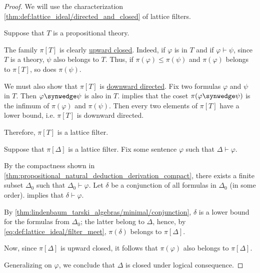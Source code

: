\begin{proof}
   We will use the characterization \cref{thm:def:lattice_ideal/directed_and_closed} of lattice filters.

  \SufficiencySubProof* Suppose that \( T \) is a propositional theory.

  The family \( \pi[T] \) is clearly \hyperref[def:closed_ordered_subset]{upward closed}. Indeed, if \( \varphi \) is in \( T \) and if \( \varphi \vdash \psi \), since \( T \) is a theory, \( \psi \) also belongs to \( T \). Thus, if \( \pi(\varphi) \leq \pi(\psi) \) and \( \pi(\varphi) \) belongs to \( \pi[T] \), so does \( \pi(\psi) \).

  We must also show that \( \pi[T] \) is \hyperref[def:directed_set]{downward directed}. Fix two formulas \( \varphi \) and \( \psi \) in \( T \). Then \( \varphi \synwedge \psi \) is also in \( T \).  implies that the coset \( \pi(\varphi \synwedge \psi) \) is the infimum of \( \pi(\varphi) \) and \( \pi(\psi) \). Then every two elements of \( \pi[T] \) have a lower bound, i.e. \( \pi[T] \) is downward directed.

  Therefore, \( \pi[T] \) is a lattice filter.

  \NecessitySubProof* Suppose that \( \pi[\Delta] \) is a lattice filter. Fix some sentence \( \varphi \) such that \( \Delta \vdash \varphi \).

  By the compactness shown in \cref{thm:propositional_natural_deduction_derivation_compact}, there exists a finite subset \( \Delta_0 \) such that \( \Delta_0 \vdash \varphi \). Let \( \delta \) be a conjunction of all formulas in \( \Delta_0 \) (in some order).  implies that \( \delta \vdash \varphi \).

  By \cref{thm:lindenbaum_tarski_algebras/minimal/conjunction}, \( \delta \) is a lower bound for the formulas from \( \Delta_0 \); the latter belong to \( \Delta \), hence, by \eqref{eq:def:lattice_ideal/filter_meet}, \( \pi(\delta) \) belongs to \( \pi[\Delta] \).

  Now, since \( \pi[\Delta] \) is upward closed, it follows that \( \pi(\varphi) \) also belongs to \( \pi[\Delta] \).

  Generalizing on \( \varphi \), we conclude that \( \Delta \) is closed under logical consequence.



\end{proof}
